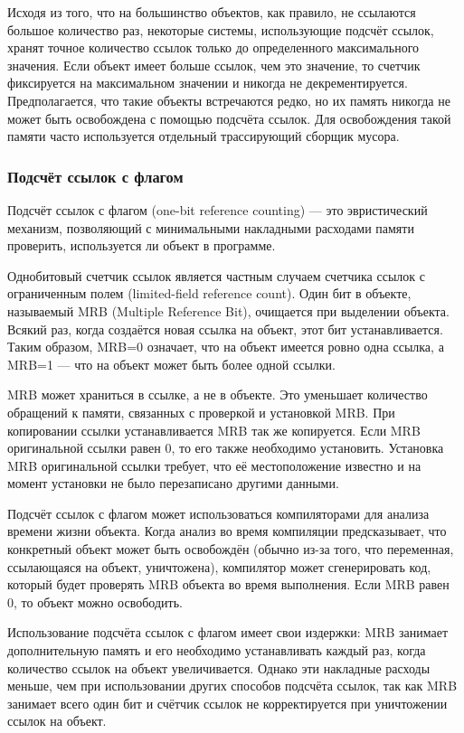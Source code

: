 Исходя из того, что на большинство объектов, как правило, не ссылаются большое количество раз, некоторые системы, использующие подсчёт ссылок, хранят точное количество ссылок только до определенного максимального значения. Если объект имеет больше ссылок, чем это значение, то счетчик фиксируется на максимальном значении и никогда не декрементируется. Предполагается, что такие объекты встречаются редко, но их память никогда не может быть освобождена с помощью подсчёта ссылок. Для освобождения такой памяти часто используется отдельный трассирующий сборщик мусора. \cite{glossary}

\subsubsection{Подсчёт ссылок с флагом}

Подсчёт ссылок с флагом (one-bit reference counting) \cite{glossary} --- это эвристический механизм, позволяющий с минимальными накладными расходами памяти проверить, используется ли объект в программе.

Однобитовый счетчик ссылок является частным случаем счетчика ссылок с ограниченным полем (limited-field reference count). Один бит в объекте, называемый MRB (Multiple Reference Bit), очищается при выделении объекта. Всякий раз, когда создаётся новая ссылка на объект, этот бит устанавливается. Таким образом, MRB=0 означает, что на объект имеется ровно одна ссылка, а MRB=1 --- что на объект может быть более одной ссылки. \cite{glossary}

MRB может храниться в ссылке, а не в объекте. Это уменьшает количество обращений к памяти, связанных с проверкой и установкой MRB. При копировании ссылки устанавливается MRB так же копируется. Если MRB оригинальной ссылки равен 0, то его также необходимо установить. Установка MRB оригинальной ссылки требует, что её местоположение известно и на момент установки не было перезаписано другими данными. \cite{glossary}

Подсчёт ссылок с флагом может использоваться компиляторами для анализа времени жизни объекта. Когда анализ во время компиляции предсказывает, что конкретный объект может быть освобождён (обычно из-за того, что переменная, ссылающаяся на объект, уничтожена), компилятор может сгенерировать код, который будет проверять MRB объекта во время выполнения. Если MRB равен 0, то объект можно освободить. \cite{glossary}

Использование подсчёта ссылок с флагом имеет свои издержки: MRB занимает дополнительную память и его необходимо устанавливать каждый раз, когда количество ссылок на объект увеличивается. Однако эти накладные расходы меньше, чем при использовании других способов подсчёта ссылок, так как MRB занимает всего один бит и счётчик ссылок не корректируется при уничтожении ссылок на объект. \cite{glossary}

